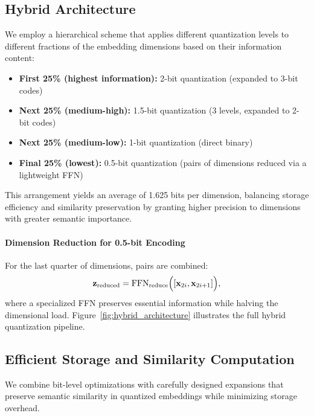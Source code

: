 \subsection{Hybrid Architecture}
\label{subsec:hybrid_architecture}

We employ a hierarchical scheme that applies different quantization levels to different fractions of the embedding dimensions based on their information content:

\begin{itemize}
    \item \textbf{First 25\% (highest information):} 2-bit quantization (expanded to 3-bit codes) 
    \item \textbf{Next 25\% (medium-high):} 1.5-bit quantization (3 levels, expanded to 2-bit codes) 
    \item \textbf{Next 25\% (medium-low):} 1-bit quantization (direct binary) 
    \item \textbf{Final 25\% (lowest):} 0.5-bit quantization (pairs of dimensions reduced via a lightweight FFN)
\end{itemize}

This arrangement yields an average of 1.625 bits per dimension, balancing storage efficiency and similarity preservation by granting higher precision to dimensions with greater semantic importance.

\paragraph{Dimension Reduction for 0.5-bit Encoding}
For the last quarter of dimensions, pairs are combined:
\begin{equation}
    \mathbf{z}_{\text{reduced}} = \text{FFN}_{\text{reduce}}\Bigl([\mathbf{x}_{2i}, \mathbf{x}_{2i+1}]\Bigr),
\end{equation}
where a specialized FFN preserves essential information while halving the dimensional load. Figure~\ref{fig:hybrid_architecture} illustrates the full hybrid quantization pipeline.

\subsection{Efficient Storage and Similarity Computation}
\label{subsec:storage_and_similarity}

We combine bit-level optimizations with carefully designed expansions that preserve semantic similarity in quantized embeddings while minimizing storage overhead.

